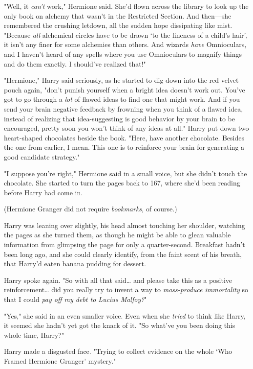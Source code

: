 "Well, it \emph{can't} work," Hermione said. She'd flown across the library to 
look up the only book on alchemy that wasn't in the Restricted Section. And 
then---she remembered the crushing letdown, all the sudden hope dissipating 
like mist. "Because \emph{all} alchemical circles have to be drawn `to the 
fineness of a child's hair', it isn't any finer for some alchemies than others. 
And wizards \emph{have} Omnioculars, and I haven't heard of any spells where 
you use Omnioculars to magnify things and do them exactly. I should've realized 
that!"

"Hermione," Harry said seriously, as he started to dig down into the red-velvet 
pouch again, "don't punish yourself when a bright idea doesn't work out. You've 
got to go through a \emph{lot} of flawed ideas to find one that might work. And 
if you send your brain negative feedback by frowning when you think of a flawed 
idea, instead of realizing that idea-suggesting is good behavior by your brain 
to be encouraged, pretty soon you won't think of any ideas at all." Harry put 
down two heart-shaped chocolates beside the book. "Here, have another 
chocolate. Besides the one from earlier, I mean. This one is to reinforce your 
brain for generating a good candidate strategy."

"I suppose you're right," Hermione said in a small voice, but she didn't touch 
the chocolate. She started to turn the pages back to 167, where she'd been 
reading before Harry had come in.

(Hermione Granger did not require \emph{bookmarks,} of course.)

Harry was leaning over slightly, his head almost touching her shoulder, 
watching the pages as she turned them, as though he might be able to glean 
valuable information from glimpsing the page for only a quarter-second. 
Breakfast hadn't been long ago, and she could clearly identify, from the faint 
scent of his breath, that Harry'd eaten banana pudding for dessert.

Harry spoke again. "So with all that said{\ldots} and please take this as a 
positive reinforcement{\ldots} did you really try to invent a way to 
\emph{mass-produce immortality} so that I could \emph{pay off my debt to Lucius 
Malfoy?}"

"Yes," she said in an even smaller voice. Even when she \emph{tried} to think 
like Harry, it seemed she hadn't yet got the knack of it. "So what've you been 
doing this whole time, Harry?"

Harry made a disgusted face. "Trying to collect evidence on the whole `Who 
Framed Hermione Granger' mystery."

